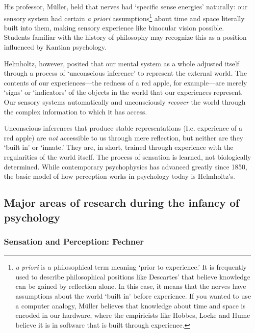 \begin{refsection}
His professor, Müller, held that nerves had `specific sense energies' naturally: our sensory system had certain \emph{a priori} assumptions\footnote{\emph{a priori} is a philosophical term meaning `prior to experience.' It is frequently used to describe philosophical positions like Descartes' that believe knowledge can be gained by reflection alone. In this case, it means that the nerves have assumptions about the world `built in' before experience. If you wanted to use a computer analogy, Müller believes that knowledge about time and space is encoded in our hardware, where the empiricists like Hobbes, Locke and Hume believe it is in software that is built through experience.} about time and space literally built into them, making sensory experience like binocular vision possible. Students familiar with the history of philosophy may recognize this as a position influenced by Kantian psychology.

Helmholtz, however, posited that our mental system as a whole adjusted itself through a process of `unconscious inference' to represent the external world. The contents of our experiences---the redness of a red apple, for example---are merely `signs' or `indicators' of the objects in the world that our experiences represent. Our sensory systems automatically and unconsciously \emph{recover} the world through the complex information to which it has access. 

Unconscious inferences that produce stable representations (I.e. experience of a red apple) are \emph{not} accessible to us through mere reflection, but neither are they `built in' or `innate.' They are, in short, trained through experience with the regularities of the world itself. The process of sensation is learned, not biologically determined. While contemporary psychophysics has advanced greatly since 1850, the basic model of how perception works in psychology today is Helmholtz's.

\subsection{Major areas of research during the infancy of psychology}
\label{majorareasofresearchduringtheinfancyofpsychology}

\subsubsection{Sensation and Perception: Fechner}
\label{sensationandperception:fechner}


\end{refsection}
